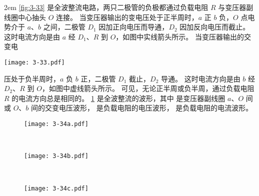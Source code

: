 \medskip\noindent
\begin{minipage}{0.5\linewidth}\parindent2em
\cref{fig:3-33} 是全波整流电路，两只二极管的负极都通过负载电阻 $R$ 与变压器副线圈中心抽头 $O$ 连接。
当变压器输出的变电压处于正半周时，$a$ 正 $b$ 负，$O$ 点电势介于 $a$、$b$ 之间，二极管 $D_1$ 因加正向电压而导通，$D_2$ 因加反向电压而截止。
这时电流方向是由 $a$ 经 $D_1$、$R$ 到 $O$，如图中实线箭头所示。
当变压器输出的交变电
\end{minipage}\hfill
\begin{minipage}{0.45\linewidth}\centering
  \begin{figurehere}
    \texttt{[image: 3-33.pdf]}
    \caption{}\label{fig:3-33}
  \end{figurehere}
\end{minipage}\par\medskip

\noindent 
压处于负半周时，$a$ 负 $b$ 正，二极管 $D_1$ 截止，$D_2$ 导通。
这时电流方向是由 $b$ 经 $D_2$、$R$ 到 $O$，如图中虚线箭头所示。
可见，无论正半周或负半周，通过负载电阻 $R$ 的电流方向总是相同的。
\cref{fig:3-34} 是全波整流的波形，其中  是变压器副线圈 $a$、$O$ 间或 $O$、$b$ 间的交变电压波形， 是负载电阻的电压波形，  是负载电阻的电流波形。

\begin{figure}
  \begin{minipage}{0.1\linewidth}
    \subcaption{}\label{fig:3-34a}
  \end{minipage}%
  \begin{minipage}{0.6\linewidth}
    \texttt{[image: 3-34a.pdf]}
  \end{minipage}\\[-3mm]
  \begin{minipage}{0.1\linewidth}
    \subcaption{}\label{fig:3-34b}
  \end{minipage}%
  \begin{minipage}{0.6\linewidth}
    \texttt{[image: 3-34b.pdf]}
  \end{minipage}\\[-3mm]
  \begin{minipage}{0.1\linewidth}
    \subcaption{}\label{fig:3-34c}
  \end{minipage}%
  \begin{minipage}{0.6\linewidth}
    \texttt{[image: 3-34c.pdf]}
  \end{minipage}
  \caption{}\label{fig:3-34}
\end{figure}

